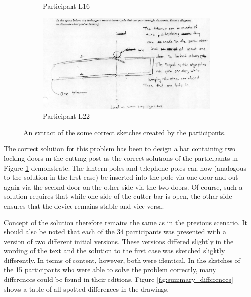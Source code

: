 \documentclass[12pt]{article}
\begin{document}
\begin{figure}[h!]
\begin{subfigure}[b]{0.3\linewidth}
    \caption{Participant L16}
  \end{subfigure}
  \begin{subfigure}[b]{0.3\linewidth}
    \includegraphics[width=\linewidth]{images/drawing_l22_con2.PNG}
    \caption{Participant L22}
  \end{subfigure}
  \caption{An extract of the some correct sketches created by the participants. \protect\cite{davies2009computational}}
  \label{fig:drawing_l24_con2}
\end{figure}

The correct solution for this problem has been to design a bar containing two locking doors in the cutting post as the correct solutions of the participants in Figure \ref{fig:drawing_l24_con2} demonstrate. The lantern poles and telephone poles can now (analogous to the solution in the first case) be inserted into the pole via one door and out again via the second door on the other side via the two doors. Of course, such a solution requires that while one side of the cutter bar is open, the other side ensures that the device remains stable and vice versa. 

Concept of the solution therefore remains the same as in the previous scenario. It should also be noted that each of the 34 participants was presented with a version of two different initial versions. These versions differed slightly in the wording of the text and the solution to the first case was sketched slightly differently. In terms of content, however, both were identical. In the sketches of the 15 participants who were able to solve the problem correctly, many differences could be found in their editions. Figure \ref{fig:summary_differences} shows a table of all spotted differences in the drawings. 
\end{document}
